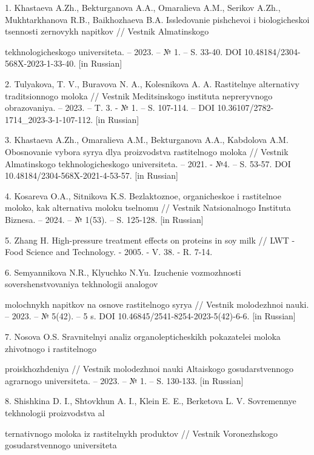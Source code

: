 \begin{noparindent}
1. Khastaeva A.Zh., Bekturganova A.A., Omaralieva A.M., Serikov A.Zh.,
Mukhtarkhanova R.B., Baikhozhaeva B.A. Issledovanie pishchevoi i
biologicheskoi tsennosti zernovykh napitkov // Vestnik Almatinskogo

tekhnologicheskogo universiteta. -- 2023. -- № 1. -- S. 33-40. DOI
10.48184/2304-568X-2023-1-33-40. {[}in Russian{]}

2. Tulyakova, T. V., Buravova N. A., Kolesnikova A. A.
Rastitel\textquotesingle nye al\textquotesingle ternativy traditsionnogo
moloka // Vestnik Meditsinskogo instituta nepreryvnogo obrazovaniya. --
2023. -- T. 3. - № 1. -- S. 107-114. -- DOI
10.36107/2782-1714\_2023-3-1-107-112. {[}in Russian{]}

3. Khastaeva A.Zh., Omaralieva A.M., Bekturganova A.A., Kabdolova A.M.
Obosnovanie vybora syr\textquotesingle ya dlya proizvodstva
rastitel\textquotesingle nogo moloka // Vestnik Almatinskogo
tekhnologicheskogo universiteta. -- 2021. - №4. -- S. 53-57. DOI
10.48184/2304-568X-2021-4-53-57. {[}in Russian{]}

4. Kosareva O.A., Sitnikova K.S. Bezlaktoznoe, organicheskoe i
rastitel\textquotesingle noe moloko, kak al\textquotesingle ternativa
moloku tsel\textquotesingle nomu // Vestnik
Natsional\textquotesingle nogo Instituta Biznesa. -- 2024. -- № 1(53).
-- S. 125-128. {[}in Russian{]}

5. Zhang H. High-pressure treatment effects on proteins in soy milk //
LWT - Food Science and Technology. - 2005. - V. 38. - R. 7-14.

6. Semyannikova N.R., Klyuchko N.Yu. Izuchenie vozmozhnosti
sovershenstvovaniya tekhnologii analogov

molochnykh napitkov na osnove
rastitel\textquotesingle nogo syr\textquotesingle ya // Vestnik
molodezhnoi nauki. -- 2023. -- № 5(42). -- 5 s. DOI
10.46845/2541-8254-2023-5(42)-6-6. {[}in Russian{]}

7. Nosova O.S. Sravnitel\textquotesingle nyi analiz organolepticheskikh
pokazatelei moloka zhivotnogo i rastitel\textquotesingle nogo

proiskhozhdeniya // Vestnik molodezhnoi nauki Altaiskogo
gosudarstvennogo agrarnogo universiteta. -- 2023. -- № 1. -- S. 130-133.
{[}in Russian{]}

8. Shishkina D. I., Shtovkhun A. I., Klein E. E., Berketova L. V.
Sovremennye tekhnologii proizvodstva al\textquotesingle

ternativnogo
moloka iz rastitel\textquotesingle nykh produktov // Vestnik
Voronezhskogo gosudarstvennogo universiteta


\end{noparindent}
